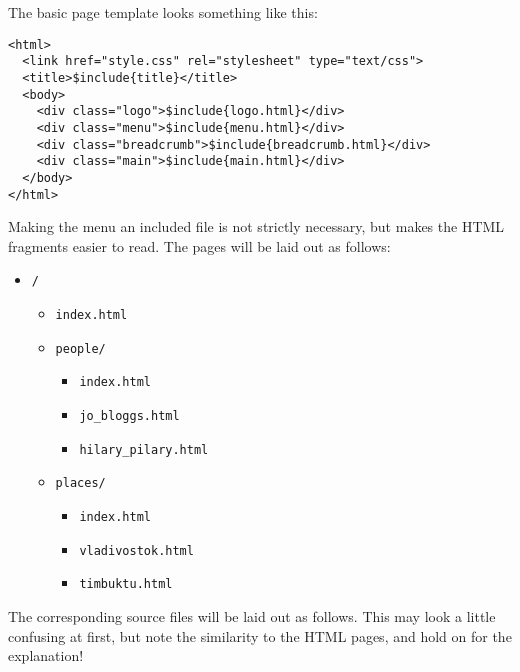 \documentclass[english]{scrartcl}
\begin{document}
The basic page template looks something like this:

\begin{verbatim}
<html>
  <link href="style.css" rel="stylesheet" type="text/css">
  <title>$include{title}</title>
  <body>
    <div class="logo">$include{logo.html}</div>
    <div class="menu">$include{menu.html}</div>
    <div class="breadcrumb">$include{breadcrumb.html}</div>
    <div class="main">$include{main.html}</div>
  </body>
</html>
\end{verbatim}

Making the menu an included file is not strictly necessary, but makes the HTML fragments easier to read. The pages will be laid out as follows:

\begin{itemize}
\item \verb|/|
  \begin{itemize}
  \item \verb|index.html|
  \item \verb|people/|
    \begin{itemize}
    \item \verb|index.html|
    \item \verb|jo_bloggs.html|
    \item \verb|hilary_pilary.html|
    \end{itemize}
  \item \verb|places/|
    \begin{itemize}
    \item \verb|index.html|
    \item \verb|vladivostok.html|
    \item \verb|timbuktu.html|
    \end{itemize}
  \end{itemize}
\end{itemize}

The corresponding source files will be laid out as follows. This may look a little confusing at first, but note the similarity to the HTML pages, and hold on for the explanation!
\end{document}
